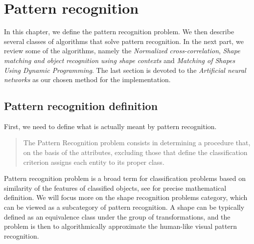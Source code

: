 \chapter{Pattern recognition}
In this chapter, we define the pattern recognition problem. We then describe several classes of algorithms that solve pattern recognition. In the next part, we review some of the algorithms, namely the \emph{Normalized cross-correlation}, \emph{Shape matching and object recognition using shape contexts} and \emph{Matching of Shapes Using Dynamic Programming}. The last section is devoted to the \emph{Artificial neural networks} as our chosen method for the implementation.

\section{Pattern recognition definition}
First, we need to define what is actually meant by pattern recognition. \citet{formalMethods} \begin{quotation}
The Pattern Recognition problem consists in determining a procedure that, on the basis of the attributes, excluding those that define the classification criterion assigns each entity to its proper class.
\end{quotation}
 Pattern recognition problem is a broad term for classification problems based on similarity of the features of classified objects, see \citet{formalMethods} for precise mathematical definition. We will focus more on the shape recognition problems category, which can be viewed as a subcategory of pattern recognition. A shape can be typically defined as an equivalence class under the group of transformations, and the problem is then to algorithmically approximate the human-like visual pattern recognition. 

